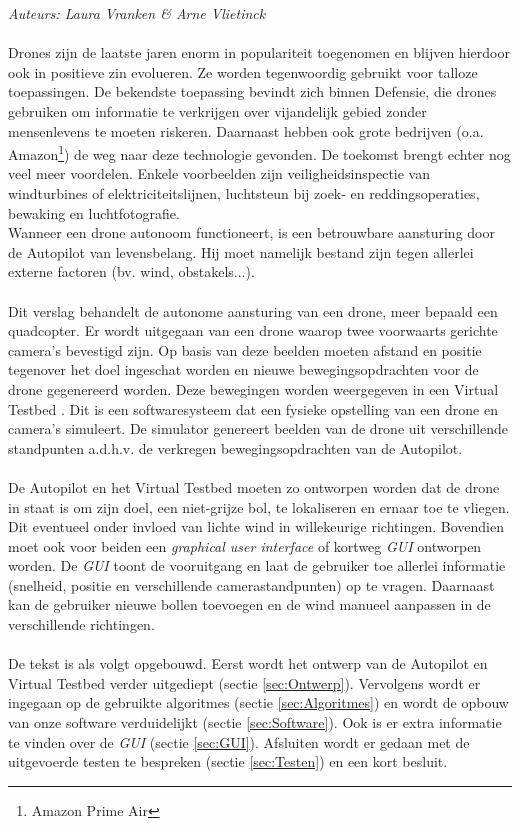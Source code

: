 {\em Auteurs: Laura Vranken \& Arne Vlietinck}
\\\\
\noindent
Drones zijn de laatste jaren enorm in populariteit toegenomen en blijven hierdoor ook in positieve zin evolueren. Ze worden tegenwoordig gebruikt voor talloze toepassingen. De bekendste toepassing bevindt zich binnen Defensie, die drones gebruiken om informatie te verkrijgen over vijandelijk gebied zonder mensenlevens te moeten riskeren. Daarnaast hebben ook grote bedrijven (o.a. Amazon\footnote{Amazon Prime Air}) de weg naar deze technologie gevonden. De toekomst brengt echter nog veel meer voordelen. Enkele voorbeelden  \cite{website:microdrones} zijn veiligheidsinspectie van windturbines of elektriciteitslijnen, luchtsteun bij zoek- en reddingsoperaties, bewaking en luchtfotografie.
\\
Wanneer een drone autonoom functioneert, is een betrouwbare aansturing door de Autopilot van levensbelang. Hij moet namelijk bestand zijn tegen allerlei externe factoren (bv. wind, obstakels...).
\\
\\
Dit verslag behandelt de autonome aansturing van een drone, meer bepaald een quadcopter. Er wordt uitgegaan van een drone waarop twee voorwaarts gerichte camera's bevestigd zijn. Op basis van deze beelden moeten afstand en positie tegenover het doel ingeschat worden en nieuwe bewegingsopdrachten voor de drone gegenereerd worden. Deze bewegingen worden weergegeven in een Virtual Testbed \cite{arcticle:opgavePeno}. Dit is een softwaresysteem dat een fysieke opstelling van een drone en camera's simuleert. De simulator genereert beelden van de drone uit verschillende standpunten a.d.h.v. de verkregen bewegingsopdrachten van de Autopilot. 
\\
\\
De Autopilot en het Virtual Testbed moeten zo ontworpen worden dat de drone in staat is om zijn doel, een niet-grijze bol, te lokaliseren en ernaar toe te vliegen. Dit eventueel onder invloed van lichte wind in willekeurige richtingen. Bovendien moet ook voor beiden een \textit{graphical user interface} of kortweg \textit{GUI} ontworpen worden. De \textit{GUI} toont de vooruitgang en laat de gebruiker toe allerlei informatie (snelheid, positie en verschillende camerastandpunten) op te vragen. Daarnaast kan de gebruiker nieuwe bollen toevoegen en de wind manueel aanpassen in de verschillende richtingen. 
\\
\\
De tekst is als volgt opgebouwd. Eerst wordt het ontwerp van de Autopilot en Virtual Testbed verder uitgediept (sectie \ref{sec:Ontwerp}). Vervolgens wordt er ingegaan op de gebruikte algoritmes (sectie \ref{sec:Algoritmes}) en wordt de opbouw van onze software verduidelijkt (sectie \ref{sec:Software}). Ook is er extra informatie te vinden over de \textit{GUI} (sectie \ref{sec:GUI}). Afsluiten wordt er gedaan met de uitgevoerde testen te bespreken (sectie \ref{sec:Testen}) en een kort besluit. \\